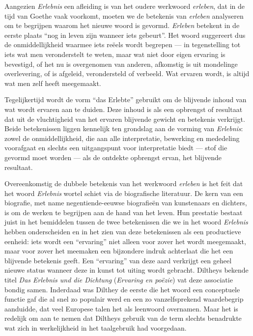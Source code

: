 Aangezien \textit{Erlebnis} een afleiding is van het oudere werkwoord \textit{erleben}, dat in de tijd van Goethe vaak voorkomt, moeten we de betekenis van \textit{erleben} analyseren om te begrijpen waarom het nieuwe woord is gevormd. \textit{Erleben} betekent in de eerste plaats ``nog in leven zijn wanneer iets gebeurt''. Het woord suggereert dus de onmiddellijkheid waarmee iets reëels wordt begrepen — in tegenstelling tot iets wat men veronderstelt te weten, maar wat niet door eigen ervaring is bevestigd, of het nu is overgenomen van anderen, afkomstig is uit mondelinge overlevering, of is afgeleid, verondersteld of verbeeld. Wat ervaren wordt, is altijd wat men zelf heeft meegemaakt.

Tegelijkertijd wordt de vorm ``das Erlebte'' gebruikt om de blijvende inhoud van wat wordt ervaren aan te duiden. Deze inhoud is als een opbrengst of resultaat dat uit de vluchtigheid van het ervaren blijvende gewicht en betekenis verkrijgt. Beide betekenissen liggen kennelijk ten grondslag aan de vorming van \textit{Erlebnis}: zowel de onmiddellijkheid, die aan alle interpretatie, bewerking en mededeling voorafgaat en slechts een uitgangspunt voor interpretatie biedt — stof die gevormd moet worden — als de ontdekte opbrengst ervan, het blijvende resultaat.

Overeenkomstig de dubbele betekenis van het werkwoord \textit{erleben} is het feit dat het woord \textit{Erlebnis} wortel schiet via de biografische literatuur. De kern van een biografie, met name negentiende-eeuwse biografieën van kunstenaars en dichters, is om de werken te begrijpen aan de hand van het leven. Hun prestatie bestaat juist in het bemiddelen tussen de twee betekenissen die we in het woord \textit{Erlebnis} hebben onderscheiden en in het zien van deze betekenissen als een productieve eenheid: iets wordt een ``ervaring'' niet alleen voor zover het wordt meegemaakt, maar voor zover het meemaken een bijzondere indruk achterlaat die het een blijvende betekenis geeft. Een ``ervaring'' van deze aard verkrijgt een geheel nieuwe status wanneer deze in kunst tot uiting wordt gebracht. Diltheys bekende titel \textit{Das Erlebnis und die Dichtung} (\textit{Ervaring en poëzie}) vat deze associatie bondig samen. Inderdaad was Dilthey de eerste die het woord een conceptuele functie gaf die al snel zo populair werd en een zo vanzelfsprekend waardebegrip aanduidde, dat veel Europese talen het als leenwoord overnamen. Maar het is redelijk om aan te nemen dat Diltheys gebruik van de term slechts benadrukte wat zich in werkelijkheid in het taalgebruik had voorgedaan.

